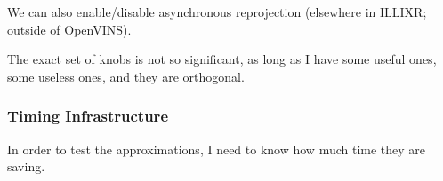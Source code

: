 We can also enable/disable asynchronous reprojection (elsewhere in ILLIXR; outside of OpenVINS).


The exact set of knobs is not so significant, as long as I have some useful ones, some useless ones, and they are orthogonal.

\subsubsection{Timing Infrastructure}

In order to test the approximations, I need to know how much time they are saving.
